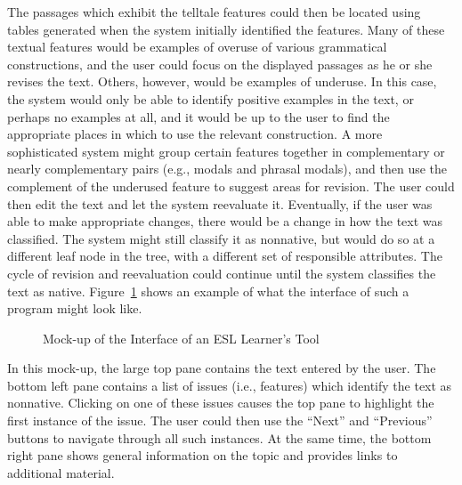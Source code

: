\documentclass[main.tex]{subfiles}
\begin{document}
The passages which exhibit the telltale features could then be located using tables generated when the system initially identified the features. Many of these textual features would be examples of overuse of various grammatical constructions, and the user could focus on the displayed passages as he or she revises the text. Others, however, would be examples of underuse. In this case, the system would only be able to identify positive examples in the text, or perhaps no examples at all, and it would be up to the user to find the appropriate places in which to use the relevant construction. A more sophisticated system might group certain features together in complementary or nearly complementary pairs (e.g., modals and phrasal modals), and then use the complement of the underused feature to suggest areas for revision. The user could then edit the text and let the system reevaluate it. Eventually, if the user was able to make appropriate changes, there would be a change in how the text was classified. The system might still classify it as nonnative, but would do so at a different leaf node in the tree, with a different set of responsible attributes. The cycle of revision and reevaluation could continue until the system classifies the text as native. Figure~\ref{fig:mockup} shows an example of what the interface of such a program might look like.
\begin{figure}[htbp]
\centering
{}
\caption{Mock-up of the Interface of an ESL Learner's Tool}
\label{fig:mockup}
\end{figure}
In this mock-up, the large top pane contains the text entered by the user. The bottom left pane contains a list of issues (i.e., features) which identify the text as nonnative. Clicking on one of these issues causes the top pane to highlight the first instance of the issue. The user could then use the ``Next'' and ``Previous'' buttons to navigate through all such instances. At the same time, the bottom right pane shows general information on the topic and provides links to additional material.
\end{document}
